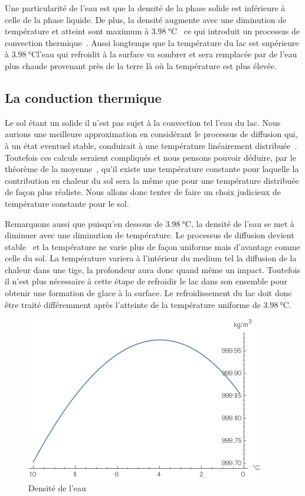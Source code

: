 \documentclass[12pt]{article}
\newcommand\critical{\ensuremath{\SI{3.98}\celsius}}
\begin{document}
Une particularit\'e de l'eau est que la densit\'e de la phase solide est inf\'erieure \`a celle de
la phase liquide. De plus, la densit\'e augmente avec une diminution de temp\'erature et atteint
sont maximum \`a \critical~\cite{WaterDensity} ce qui introduit un processus de convection
thermique~\cite{ConvNat}. Aussi longtemps que la temp\'erature du lac est sup\'erieure \`a
\critical l'eau qui refroidit \`a la surface va sombrer et sera remplac\'ee par de l'eau
plus chaude provenant pr\`es de la terre l\`a o\`u la temp\'erature est plus \'elev\'ee.

\subsection{La conduction thermique}\label{Conduc}

Le sol \'etant un solide il n'est pas sujet \`a la convection tel l'eau du lac. Nous aurions une
meilleure approximation en consid\'erant le processus de diffusion qui, \`a un \'etat eventuel
stable, conduirait \`a une temp\'erature lin\'eairement distribu\'ee~\cite{TempLinear}. Toutefois ces
calculs seraient compliqu\'es et nous pensons pouvoir d\'eduire, par le th\'eor\`eme de la
moyenne~\cite{AvgValue}, qu'il existe une temp\'erature constante pour laquelle la contribution en
chaleur du sol sera la m\^eme que pour une temp\'erature distribu\'ee de fa\c con plus r\'ealiste.
Nous allons donc tenter de faire un choix judicieux de temp\'erature constante pour le sol.

Remarquons aussi que puisqu'en dessous de \critical, la densit\'e de l'eau se met \`a
diminuer avec une diminution de temp\'erature. Le processus de diffusion devient
stable~\cite{HydroStab} et la temp\'erature ne varie plus de fa\c con uniforme mais d'avantage comme
celle du sol. La temp\'erature variera \`a l'int\'erieur du medium tel la diffusion de la chaleur
dans une tige, la profondeur aura donc quand m\^eme un impact. Toutefois il n'est plus n\'ecessaire
\`a cette \'etape de refroidir le lac dans son ensemble pour obtenir une formation de glace \`a la
surface. Le refroidissement du lac doit donc \^etre trait\'e diff\'eremment apr\`es l'atteinte
de la temp\'erature uniforme de \critical.

\begin{figure}
    \centering
    \includegraphics[scale=0.9]{WaterDensity.png}
    \caption{Densit\'e de l'eau}
\end{figure}
\end{document}
